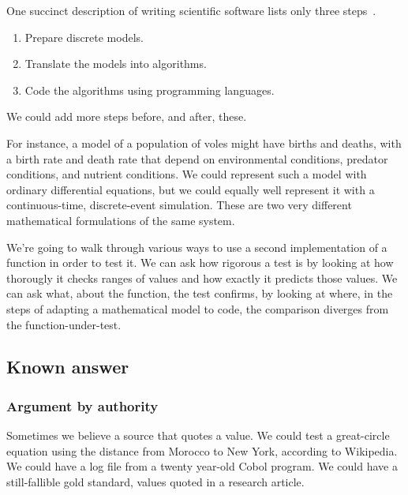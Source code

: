\documentclass[fleqn,10pt]{olplainarticle}
\begin{document}
One succinct description of writing scientific software 
lists only three steps~\citep{dahlgren2005}.
\begin{enumerate}
  \item Prepare discrete models.
  \item Translate the models into algorithms.
  \item Code the algorithms using programming languages.
\end{enumerate}
We could add more steps before, and after, these.

For instance, a model of a population of voles might have
births and deaths, with a birth rate and death rate that
depend on environmental conditions, predator conditions,
and nutrient conditions. We could represent such a model
with ordinary differential equations, but we could equally
well represent it with a continuous-time, discrete-event
simulation. These are two very different mathematical
formulations of the same system.

We're going to walk through various ways to use a second
implementation of a function in order to test it.
We can ask how rigorous a test is by looking at how
thorougly it checks ranges of values and how exactly
it predicts those values. We can ask what, about the function,
the test confirms, by looking at where, in the steps
of adapting a mathematical model to code, the comparison
diverges from the function-under-test.


\subsection{Known answer}
\subsubsection{Argument by authority}
Sometimes we believe a source that quotes a value. We could
test a great-circle equation using the distance from Morocco
to New York, according to Wikipedia. We could have a log
file from a twenty year-old Cobol program. We could have
a still-fallible gold standard, values quoted in a research article.
\end{document}
